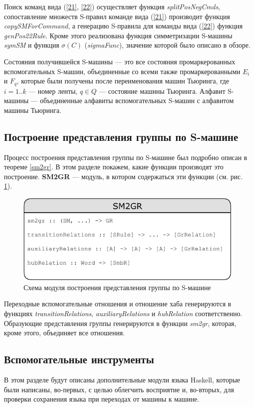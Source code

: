 \documentclass[14pt]{matmex-diploma-custom}
\begin{document}
Поиск команд вида (\ref{21}, \ref{22}) осуществляет функция \textit{splitPosNegCmds}, сопоставление множеств S-правил команде вида (\ref{21}) производит функция \textit{copySMForCommand}, а генерацию S-правила для команды вида (\ref{22}) функция \textit{genPos22Rule}.
Кроме этого реализована функция симметризации S-машины \textit{symSM} и функция $\sigma(C)$ (\textit{sigmaFunc}), значение которой было описано в обзоре.

Состояния получившейся S-машины --- это все состояния промаркерованных вспомогательных S-машин, объединенные со всеми также промаркерованными $E_i$ и $F_q$, которые были получены после переименования машин Тьюринга, где $i=1..k$ --- номер ленты, $q \in Q$ --- состояние машины Тьюринга.
Алфавит S-машины --- объединенные алфавиты вспомогательных S-машин с алфавитом машины Тьюринга. 

\subsection{Построение представления группы по S-машине}
Процесс построения представления группы по S-машине был подробно описан в теореме \ref{sm2gr}. В этом разделе покажем, какие функции производят это построение. 
\textbf{SM2GR} --- модуль, в котором содержаться эти функции (см. рис. \ref{fig:SM2GR}).

\begin{figure}[H]
\centering
  \includegraphics[width=\linewidth]{pics/SM2GR.pdf}
  \caption{Схема модуля построения представления группы по S-машине}
  \label{fig:SM2GR}
\end{figure}

Переходные вспомогательные отношения и отношение хаба генерируются в функциях \textit{transitionRelations}, \textit{auxiliaryRelations} и \textit{hubRelation} соответственно. Образующие представления группы генерируются в функции \textit{sm2gr}, которая, кроме этого, объединяет все отношения.

\subsection{Вспомогательные инструменты}
В этом разделе будут описаны дополнительные модули языка Haskell, которые были написаны, во-первых, с целью облегчить восприятие и, во-вторых, для проверки сохранения языка при переходах от машины к машине. 
\end{document}
